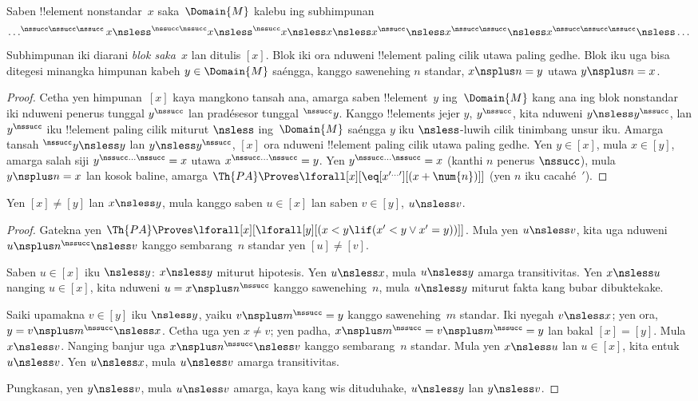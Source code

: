 \documentclass[../../../include/open-logic-section]{subfiles}
\begin{document}
\begin{prop}
Saben !!{element} nonstandar~$x$
saka~$\Domain{M}$
kalebu ing subhimpunan
\[
\dots ^{\nssucc\nssucc\nssucc}x \nsless ^{\nssucc\nssucc}x \nsless
^{\nssucc}x \nsless x \nsless x^{\nssucc} \nsless x^{\nssucc\nssucc}
\nsless x^{\nssucc\nssucc\nssucc} \nsless \dots
\]
Subhimpunan iki
diarani \emph{blok saka~$x$}
lan ditulis $[x]$.
Blok iki ora nduweni
!!{element} paling cilik
utawa paling gedhe.
Blok iku uga bisa
ditegesi minangka
himpunan kabeh
$y \in \Domain{M}$
saéngga, kanggo
sawenehing $n$ standar,
$x \nsplus n = y$
utawa $y \nsplus n = x$.
\end{prop}

\begin{proof}
Cetha yen himpunan~$[x]$
kaya mangkono tansah ana,
amarga saben !!{element}~$y$
ing~$\Domain{M}$
kang ana ing blok nonstandar iki
nduweni penerus tunggal
$y^\nssucc$
lan pradésesor tunggal
$^\nssucc y$.
Kanggo !!{element}s
jejer $y$, $y^\nssucc$,
kita nduweni
$y \nsless y^\nssucc$,
lan $y^\nssucc$
iku !!{element} paling cilik
miturut $\nsless$
ing~$\Domain{M}$
saéngga $y$
iku $\nsless$-luwih cilik
tinimbang unsur iku.
Amarga tansah
$^\nssucc y \nsless y$
lan $y \nsless y^\nssucc$,
$[x]$ ora nduweni
!!{element} paling cilik
utawa paling gedhe.
Yen $y \in [x]$,
mula $x \in [y]$,
amarga salah siji
$y^{\nssucc\dots\nssucc} = x$
utawa
$x^{\nssucc\dots\nssucc} = y$.
Yen
$y^{\nssucc\dots\nssucc} = x$
(kanthi $n$ penerus
$\nssucc$),
mula $y \nsplus n = x$
lan kosok baline,
amarga
$\Th{PA} \Proves \lforall[x][\eq[x^{\prime\dots\prime}][(x +
    \num{n})]]$
(yen $n$ iku
cacahé~$\prime$).
\end{proof}

\begin{prop}
Yen $[x] \neq [y]$
lan $x \nsless y$,
mula kanggo saben
$u \in [x]$
lan saben $v \in [y]$,
$u \nsless v$.
\end{prop}

\begin{proof}
Gatekna yen
$\Th{PA} \Proves \lforall[x][\lforall[y][(x < y \lif (x' < y
    \lor x' = y))]]$.
Mula yen $u \nsless v$,
kita uga nduweni
$u \nsplus
n^\nssucc \nsless v$
kanggo sembarang~$n$ standar
yen $[u] \neq [v]$.

Saben $u \in [x]$
iku $\nsless y$:
$x \nsless y$
miturut hipotesis.
Yen $u \nsless x$,
mula $u \nsless y$
amarga transitivitas.
Yen $x \nsless u$
nanging $u \in [x]$,
kita nduweni
$u = x\nsplus n^\nssucc$
kanggo sawenehing~$n$,
mula $u \nsless y$
miturut fakta kang
bubar dibuktekake.
  
Saiki upamakna
$v \in [y]$
iku $\nsless y$,
yaiku
$v \nsplus
m^\nssucc = y$
kanggo sawenehing~$m$
standar. Iki nyegah
$v \nsless x$;
yen ora,
$y = v \nsplus m^\nssucc
\nsless x$.
Cetha uga yen $x \neq
v$; yen padha,
$x \nsplus m^\nssucc =
v \nsplus m^\nssucc = y$
lan bakal
$[x] = [y]$.
Mula $x \nsless v$.
Nanging banjur uga
$x \nsplus
n^\nssucc \nsless v$
kanggo sembarang~$n$ standar.
Mula yen $x \nsless u$
lan $u \in
[x]$, kita entuk
$u \nsless v$.
Yen $u \nsless x$,
mula $u \nsless v$
amarga transitivitas.

Pungkasan, yen
$y \nsless v$,
mula $u \nsless v$
amarga, kaya kang wis
dituduhake,
$u \nsless y$
lan $y \nsless v$.
\end{proof}
\end{document}
